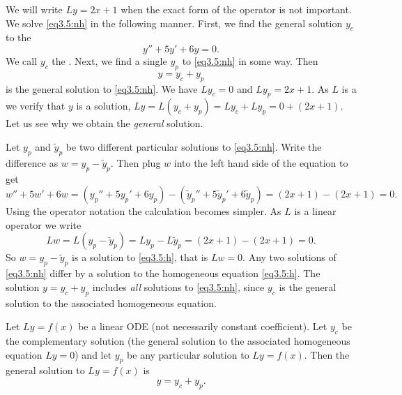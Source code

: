 \documentclass[12pt]{book}
\begin{document}
We will write $Ly = 2x+1$ when the exact form of the operator is not
important.
We solve \eqref{eq3.5:nh} in the following manner.  First, we find the general
solution $y_c$
to the \emph{}
\begin{equation} \label{eq3.5:h}
y'' + 5y'+ 6y = 0 .
\end{equation}
We call $y_c$ the \emph{}.
Next, we find a
single \emph{} $y_p$ to \eqref{eq3.5:nh} in some
way.  Then
\begin{equation*}
y = y_c + y_p
\end{equation*}
is the general solution to \eqref{eq3.5:nh}.  
We have $L y_c = 0$ and $L y_p = 2x+1$.  As
$L$ is a \emph{}
we verify that $y$ is a solution, $L y = L ( y_c + y_p) = L y_c + L y_p = 0
+ (2x+1)$.  Let us see
why we obtain the \emph{general} solution.

Let $y_p$ and $\tilde{y}_p$ be two different
particular solutions 
to \eqref{eq3.5:nh}.
Write the difference as
$w = y_p - \tilde{y}_p$.  Then plug $w$
into the left hand side of the equation to get
\begin{equation*}
w'' + 5w'+ 6w =
(y_p'' + 5y_p'+ 6y_p) -
(\tilde{y}_p'' + 5\tilde{y}_p'+ 6\tilde{y}_p) =
(2x+1) - (2x+1) = 0 .
\end{equation*}
Using the operator notation the calculation becomes simpler.
As $L$ is a linear operator we write
\begin{equation*}
Lw = L(y_p - \tilde{y}_p) =
Ly_p - L\tilde{y}_p =
(2x+1)-(2x+1) = 0 .
\end{equation*}
So $w = y_p - \tilde{y}_p$ is a solution to \eqref{eq3.5:h}, that is
$Lw = 0$.  Any two
solutions of \eqref{eq3.5:nh} differ by a solution to the homogeneous
equation \eqref{eq3.5:h}.  The solution $y = y_c + y_p$ includes \emph{all}
solutions to \eqref{eq3.5:nh},
since $y_c$ is the general solution to the associated homogeneous equation.

\begin{theorem}
Let $Ly=f(x)$ be a linear ODE (not necessarily constant
coefficient).  Let $y_c$ be the complementary solution
(the general
solution to the associated homogeneous equation $Ly = 0$) and let $y_p$
be any particular solution to $Ly=f(x)$.  Then the general
solution to $Ly=f(x)$ is
\begin{equation*}
y = y_c + y_p.
\end{equation*}
\end{theorem}
\end{document}
